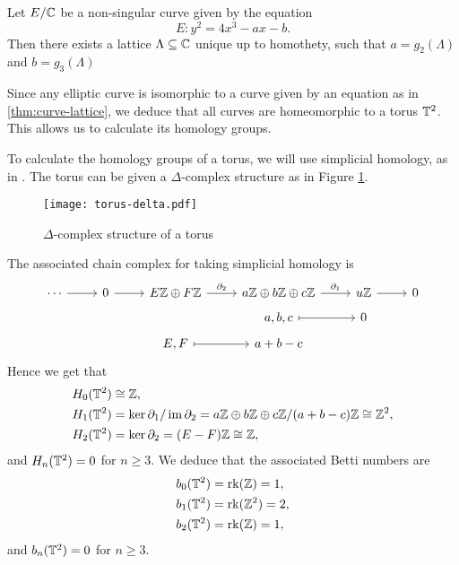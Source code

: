 \begin{theorem}
	\label{thm:curve-lattice}
	Let $E/\mathbb{C}$ be a non-singular curve given by the equation
	\begin{equation*}
		E: y^2 = 4x^3 - ax - b.
	\end{equation*} 
	Then there exists a lattice
	$\Lambda \subseteq \mathbb{C}$ unique up to homothety, such that
	$a = g_2(\Lambda)$ and $b = g_3(\Lambda)$
\end{theorem}

Since any elliptic curve is isomorphic to a curve given by an equation as in
\ref{thm:curve-lattice}, we deduce that all curves are homeomorphic
to a torus $\mathbb{T}^2$. This allows us to calculate its homology groups.

To calculate the homology groups of a torus, we will use simplicial homology,
as in \cite[\S2.1]{hatcher}. The torus can be given a $\Delta$-complex structure
as in Figure \ref{fig:torus-delta}.
\begin{figure}[h]
	\centering 
	\texttt{[image: torus-delta.pdf]}
	\caption[torus-delta]{$\Delta$-complex structure of a torus}
	\label{fig:torus-delta}
\end{figure}
The associated chain complex for taking simplicial homology is 
\begin{equation*}
	\begin{tikzcd}[row sep=tiny]
	\cdots & 0 & {E\Z \oplus F\Z} & {a\Z\oplus b\Z\oplus c\Z} & u\Z & 0 \\
	&&& {a,b,c} & 0 \\
	&& {E,F} & {a +b-c}
	\arrow["\partial_1", from=1-4, to=1-5]
	\arrow["\partial_2", from=1-3, to=1-4]
	\arrow[from=1-5, to=1-6]
	\arrow[from=1-2, to=1-3]
	\arrow[from=1-1, to=1-2]
	\arrow[maps to, from=3-3, to=3-4]
	\arrow[maps to, from=2-4, to=2-5]
\end{tikzcd}
\end{equation*}
Hence we get that
\begin{align*}
	H_0(\mathbb{T}^2) &\cong \mathbb{Z},\\
	H_1(\mathbb{T}^2) &= \ker \partial_1 / \operatorname{im} \partial_2
	= a\mathbb{Z} \oplus b\mathbb{Z} \oplus c\mathbb{Z} / (a + b - c)\mathbb{Z} \cong \mathbb{Z}^2,\\
	H_2(\mathbb{T}^2) &= \ker \partial_2 = (E-F)\mathbb{Z} \cong \mathbb{Z},
\end{align*}
and $H_n(\mathbb{T}^2) = 0$ for $n \geq 3$.
We deduce that the associated Betti numbers are
\begin{align*}
	b_0(\mathbb{T}^2) &= \operatorname{rk}(\mathbb{Z}) = 1,\\
	b_1(\mathbb{T}^2) &= \operatorname{rk}(\mathbb{Z}^2) = 2,\\
	b_2(\mathbb{T}^2) &= \operatorname{rk}(\mathbb{Z}) = 1,
\end{align*}
and $b_n(\mathbb{T}^2) = 0$ for $n \geq 3$.
